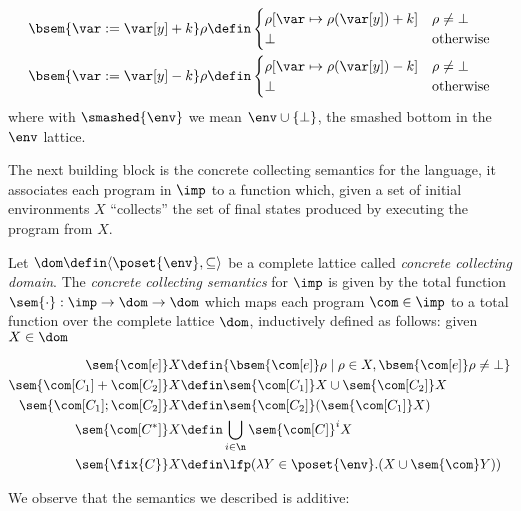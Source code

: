 \begin{definition}
\begin{align*}
    \bsem{\var:= \var[y] + k} \rho & \defin \begin{cases} \rho [\var\mapsto \rho(\var[y]) + k] & \rho \neq \bot \\ \bot & \text{otherwise}\end{cases} \\
    \bsem{\var:= \var[y] - k} \rho & \defin \begin{cases} \rho [\var\mapsto \rho(\var[y]) - k] & \rho \neq \bot \\ \bot & \text{otherwise}\end{cases} \\
  \end{align*}
  where with \(\smashed{\env}\) we mean \(\env \cup \{\bot\}\), the
  smashed bottom in the \(\env\) lattice.
\end{definition}

The next building block is the concrete collecting semantics for the
language, it associates each program in \(\imp\) to a function which,
given a set of initial environments \(X\) ``collects'' the set of
final states produced by executing the program from \(X\).

\begin{definition}\label{de:concretesem}
  Let \(\dom \defin \langle \poset{\env} , \subseteq \rangle\) be a
  complete lattice called \emph{concrete collecting domain}. The
  \emph{concrete collecting semantics} for \(\imp\) is given by the
  total function \(\sem{\cdot} : \imp \to \dom \to \dom\) which maps
  each program \(\com \in \imp\) to a total function over the complete
  lattice \(\dom\), inductively defined as follows: given
  \(X \in \dom\)

  \begin{align*}
    \sem{\com[e]} X & \defin \{\bsem{\com[e]} \rho \mid \rho \in X,
                      \bsem{\com[e]} \rho \neq \bot\} \\
    \sem{\com[C_1] + \com[C_2]} X & \defin \sem{\com[C_1]} X \cup \sem{\com[C_2]} X \\
    \sem{\com[C_1] ; \com[C_2]} X & \defin \sem{\com[C_2]}(\sem{\com[C_1]} X) \\
    \sem{\com[C^*]} X & \defin \bigcup_{i \in \n} \sem{\com[C]}^i X \\
    \sem{\fix{C}} X & \defin \lfp(\lambda Y \in\poset{\env} . (X \cup \sem{\com}Y))
  \end{align*}
\end{definition}

We observe that the semantics we described is additive:

